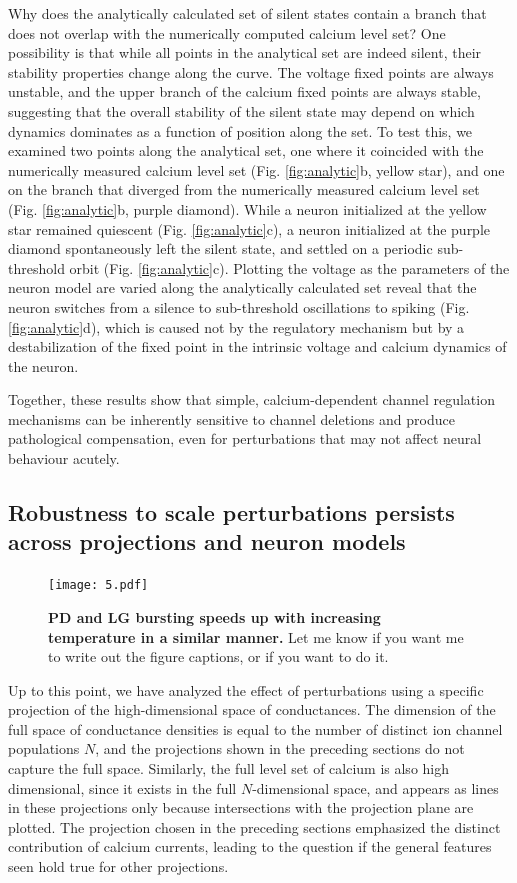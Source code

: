 \documentclass[9pt,lineno]{elife}
\begin{document}
Why does the analytically calculated set of silent states contain a branch that does not overlap with the numerically computed calcium level set? One possibility is that while all points in the analytical set are indeed silent, their stability properties change along the curve. The voltage fixed points are always unstable, and the upper branch of the calcium fixed points are always stable, suggesting that the overall stability of the silent state may depend on which dynamics dominates as a function of position along the set. To test this, we examined two points along the analytical set, one where it coincided with the numerically measured calcium level set (Fig. \ref{fig:analytic}b, yellow star), and one on the branch that diverged from the numerically measured calcium level set (Fig. \ref{fig:analytic}b, purple diamond). While a neuron initialized at the yellow star remained quiescent (Fig. \ref{fig:analytic}c), a neuron initialized at the purple diamond spontaneously left the silent state, and settled on a periodic sub-threshold orbit (Fig. \ref{fig:analytic}c). Plotting the voltage as the parameters of the neuron model are varied along the analytically calculated set reveal that the neuron switches from a silence to sub-threshold oscillations to spiking (Fig. \ref{fig:analytic}d), which is caused not by the regulatory mechanism but by a destabilization of the fixed point in the intrinsic voltage and calcium dynamics of the neuron. 

Together, these results show that simple, calcium-dependent channel regulation mechanisms can be inherently sensitive to channel deletions and produce pathological compensation, even for perturbations that may not affect neural behaviour acutely.

\subsection{Robustness to scale perturbations persists across projections and neuron models}

\begin{figure}[!hbp]
\centering
\begin{fullwidth}
\texttt{[image: 5.pdf]}
\end{fullwidth}
\caption{\textbf{PD and LG bursting speeds up with increasing temperature in a similar manner.} Let me know if you want me to write out the figure captions, or if you want to do it.   }
\end{figure}

Up to this point, we have analyzed the effect of perturbations using a specific projection of the high-dimensional space of conductances. The dimension of the full space of conductance densities is equal to the number of distinct ion channel populations $N$, and the projections shown in the preceding sections do not capture the full space. Similarly, the full level set of calcium is also high dimensional, since it exists in the full $N$-dimensional space, and appears as lines in these projections only because intersections with the projection plane are plotted. The projection chosen in the preceding sections emphasized the distinct contribution of calcium currents, leading to the question if the general features seen hold true for other projections.
\end{document}
